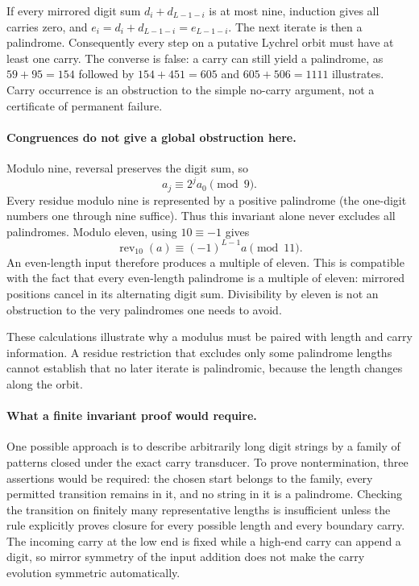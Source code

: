 \documentclass[11pt,a4paper]{article}
\begin{document}
If every mirrored digit sum $d_i+d_{L-1-i}$ is at most nine, induction
gives all carries zero, and $e_i=d_i+d_{L-1-i}=e_{L-1-i}$. The
next iterate is then a palindrome. Consequently every step on a
putative Lychrel orbit must have at least one carry. The converse is
false: a carry can still yield a palindrome, as $59+95=154$ followed
by $154+451=605$ and $605+506=1111$ illustrates. Carry occurrence
is an obstruction to the simple no-carry argument, not a certificate
of permanent failure.

\paragraph{Congruences do not give a global obstruction here.}
Modulo nine, reversal preserves the digit sum, so
\[
                        a_j\equiv2^j a_0\pmod9.
\]
Every residue modulo nine is represented by a positive palindrome
(the one-digit numbers one through nine suffice). Thus this invariant
alone never excludes all palindromes. Modulo eleven, using
$10\equiv-1$ gives
\[
 \operatorname{rev}_{10}(a)\equiv(-1)^{L-1}a\pmod{11}.
\]
An even-length input therefore produces a multiple of eleven. This is
compatible with the fact that every even-length palindrome is a
multiple of eleven: mirrored positions cancel in its alternating
digit sum. Divisibility by eleven is not an obstruction to the very
palindromes one needs to avoid.

These calculations illustrate why a modulus must be paired with
length and carry information. A residue restriction that excludes only
some palindrome lengths cannot establish that no later iterate is
palindromic, because the length changes along the orbit.

\paragraph{What a finite invariant proof would require.}
One possible approach is to describe arbitrarily long digit strings
by a family of patterns closed under the exact carry transducer.
To prove nontermination, three assertions would be required: the chosen
start belongs to the family, every permitted transition remains in it,
and no string in it is a palindrome. Checking the transition on finitely
many representative lengths is insufficient unless the rule explicitly
proves closure for every possible length and every boundary carry.
The incoming carry at the low end is fixed while a high-end carry can
append a digit, so mirror symmetry of the input addition does not make
the carry evolution symmetric automatically.
\end{document}
